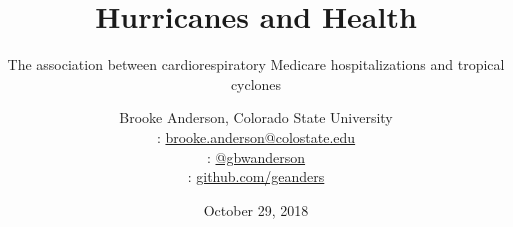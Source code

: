 \usepackage{booktabs}
\usepackage{array}
\usepackage{colortbl}
\usepackage[british]{babel}
\usepackage{graphicx,hyperref,url}
\usepackage{fontawesome}
\usepackage{hyperref}
\usepackage{adjustbox}
\hypersetup{colorlinks=true,allcolors=blue}

\title{Hurricanes and Health}
\subtitle{The association between cardiorespiratory Medicare hospitalizations and tropical cyclones}
\date{October 29, 2018}

\author[Anderson]{
  Brooke Anderson, Colorado State University \\
  {\small \faEnvelope: \url{brooke.anderson@colostate.edu}} \\
  {\small \faTwitter: \href{www.twitter.com/gbwanderson}{@gbwanderson}} \\
  {\small \faGithub:  \url{github.com/geanders}}
  }


